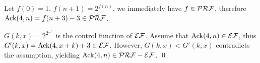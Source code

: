 \begin{pf} \rm
 Let $f(0) = 1$, $f(n + 1) = 2^{f(n)}$, we immediately have $f\in\mathcal{PRF}$,
 therefore  $\mathrm{Ack}(4, n) = f(n + 3) - 3 \in\mathcal{PRF}$.

 $G(k, x) = 2^{2^{\ldots^x}}$ is the control function of $\mathcal{EF}$.
 Assume that $\mathrm{Ack}(4, n) \in\mathcal{EF}$,
 thus $G'(k, x) = \mathrm{Ack}(4, x + k) + 3\in\mathcal{EF}$.
 However, $G(k, x) < G'(k, x)$ contradicts the assumption, 
yielding $\mathrm{Ack}(4, n) \in\mathcal{PRF}-\mathcal{EF}$. \qed
\end{pf}
